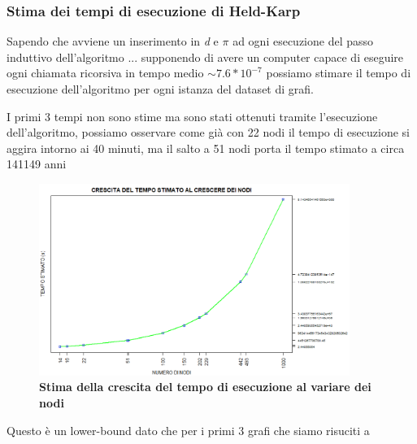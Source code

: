 \documentclass[]{article}
\begin{document}
\begin{flushleft}
\newpage
\subsubsection{Stima dei tempi di esecuzione di Held-Karp}

Sapendo che avviene un inserimento in \textit{d} e $\pi$ ad ogni esecuzione del passo induttivo dell'algoritmo ...  supponendo di avere un computer capace di eseguire ogni chiamata ricorsiva in tempo medio $\sim 7.6*10^{-7}$ possiamo stimare il tempo di esecuzione dell'algoritmo per ogni istanza del dataset di grafi.

I primi 3 tempi non sono stime ma sono stati ottenuti tramite l'esecuzione dell'algoritmo, possiamo osservare come già con 22 nodi il tempo di esecuzione si aggira intorno ai 40 minuti, ma il salto a 51 nodi porta il tempo stimato a circa 141149 anni
\begin{figure}[h]
\centering
\includegraphics[width=0.9\textwidth, height=\textheight,keepaspectratio]{STIME_TEMPO.png}
\caption{\textbf{Stima della crescita del tempo di esecuzione al variare dei nodi}}
\label{STIME_temp}
\end{figure}
Questo è un lower-bound dato che per i primi 3 grafi che siamo risuciti a 
\end{flushleft}
\end{document}

